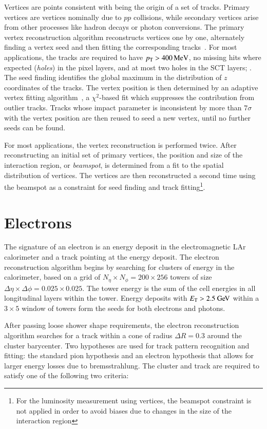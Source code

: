 Vertices are points consistent with being the origin of a set of tracks. Primary vertices are vertices nominally due to $pp$ collisions, while secondary vertices arise from other processes like hadron decays or photon conversions. The primary vertex reconstruction algorithm reconstructs vertices one by one, alternately finding a vertex seed and then fitting the corresponding tracks~\cite{TheATLASCollaboration:2010wy,TheATLASCollaboration:2012tja}. For most applications, the tracks are required to have $p_{\text{T}}>\SI{400}{\mega\electronvolt}$, no missing hits where expected (\emph{holes}) in the pixel layers, and at most two holes in the SCT layers; . The seed finding identifies the global maximum in the distribution of $z$ coordinates of the tracks. The vertex position is then determined by an adaptive vertex fitting algorithm~\cite{Waltenberger:2007hz}, a $\chi^2$-based fit which suppresses the contribution from outlier tracks. Tracks whose impact parameter is inconsistent by more than $7\sigma$ with the vertex position are then reused to seed a new vertex, until no further seeds can be found. 

For most applications, the vertex reconstruction is performed twice. After reconstructing an initial set of primary vertices, the position and size of the interaction region, or \emph{beamspot}, is determined from a fit to the spatial distribution of vertices. The vertices are then reconstructed a second time using the beamspot as a constraint for seed finding and track fitting\footnote{For the luminosity measurement using vertices, the beamspot constraint is not applied in order to avoid biases due to changes in the size of the interaction region}.

\section{Electrons}\label{sec:event-reconstruction-electrons}
The signature of an electron is an energy deposit in the electromagnetic LAr calorimeter and a track pointing at the energy deposit. The electron reconstruction algorithm begins by searching for clusters of energy in the calorimeter, based on a grid of $N_{\eta}\times N_{\phi}=200\times256$ towers of size $\Delta\eta\times\Delta\phi = 0.025\times0.025$. The tower energy is the sum of the cell energies in all longitudinal layers within the tower. Energy deposits with $\Et>2.5 \GeV$ within a $3\times 5$ window of towers form the seeds for both electrons and photons.

After passing loose shower shape requirements, the electron reconstruction algorithm searches for a track within a cone of radius $\Delta R=0.3$ around the cluster barycenter. Two hypotheses are used for track pattern recognition and fitting: the standard pion hypothesis and an electron hypothesis that allows for larger energy losses due to bremsstrahlung. The cluster and track are required to satisfy one of the following two criteria:

